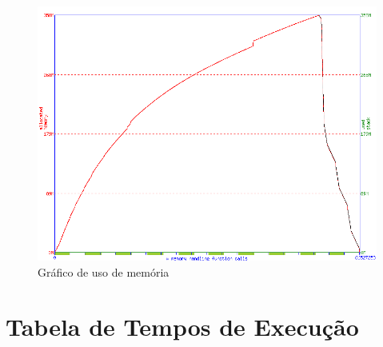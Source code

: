 \documentclass[a4paper]{report}
\begin{document}
\begin{figure}[H]
    \begin{center}
        \includegraphics[width=1\textwidth]{memusage.png}\par\vspace{1cm}
        \caption{Gráfico de uso de memória}
        \label{img:memusage}
    \end{center}
\end{figure}

\chapter{Tabela de Tempos de Execução}
\end{document}
